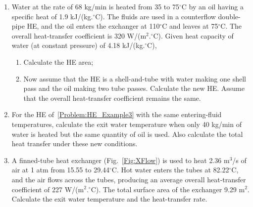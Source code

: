 \documentclass[12pts,a4paper,amsmath,amssymb,floatfix]{article}%
\begin{document}
\begin{enumerate}[label=\bfseries Problem \arabic*:]
\item\label{Problem:HE_Example3} Water at the rate of 68 kg/min is heated from 35 to 75$^{\circ}$C by an oil having a specific heat of 1.9 kJ/(kg.$^{\circ}$C). The fluids are used in a counterflow double-pipe HE, and the oil enters the exchanger at 110$^{\circ}$C and leaves at 75$^{\circ}$C. The overall heat-transfer coefficient is 320 W/(m$^{2}.^{\circ}$C). Given heat capacity of water (at constant pressure) of 4.18 kJ/(kg.$^{\circ}$C),
\begin{enumerate}
   \item Calculate the HE area;
   \item Now assume that the HE is a shell-and-tube with water making one shell pass and the oil making two tube passes. Calculate the new HE. Assume that the overall heat-transfer coefficient remains the same.
\end{enumerate}

\item\label{Problem:HE_Example4}For the HE of~\ref{Problem:HE_Example3} with the same entering-fluid temperatures, calculate the exit water temperature when only 40 kg/min of water is heated but the same quantity of oil is used. Also calculate the total heat transfer under these new conditions.

\item\label{Problem:HE_Example5}  A finned-tube heat exchanger (Fig.~\ref{Fig:XFlow}) is used to heat 2.36 m$^{3}$/s of air at 1 atm from 15.55 to 29.44$^{\circ}$C. Hot water enters the tubes at 82.22$^{\circ}$C, and the air flows across the tubes, producing an average overall heat-transfer coefficient of 227 W/(m$^{2}$.$^{\circ}$C). The total surface area of the exchanger 9.29 m$^{2}$. Calculate the exit water temperature and the heat-transfer rate.


\end{enumerate}
\end{document}
